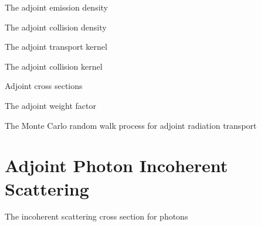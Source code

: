 \documentclass{beamer}
\begin{document}
\begin{frame}{The adjoint emission density}

\end{frame}

\begin{frame}{The adjoint collision density}

\end{frame}

\begin{frame}{The adjoint transport kernel}

\end{frame}

\begin{frame}{The adjoint collision kernel}

\end{frame}

\begin{frame}{Adjoint cross sections}

\end{frame}

\begin{frame}{The adjoint weight factor}

\end{frame}

\begin{frame}{The Monte Carlo random walk process for adjoint radiation transport}

\end{frame}

\section{Adjoint Photon Incoherent Scattering}
\begin{frame}{The incoherent scattering cross section for photons}

\end{frame}
\end{document}
